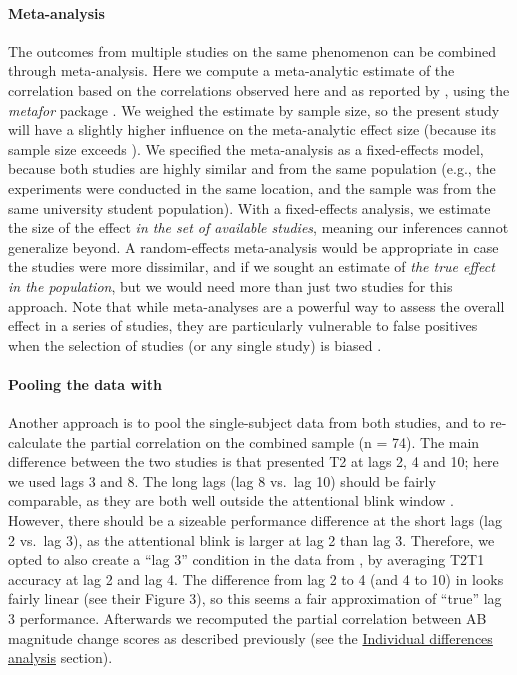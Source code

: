 \documentclass[11pt,]{memoir}
\let\oldparagraph\paragraph
\renewcommand{\paragraph}[1]{\oldparagraph{#1}\mbox{}}
\begin{document}
\hypertarget{meta}{%
\paragraph{Meta-analysis}\label{meta}}

The outcomes from multiple studies on the same phenomenon can be combined through meta-analysis. Here we compute a meta-analytic estimate of the correlation based on the correlations observed here and as reported by \textcite{London2015}, using the \emph{metafor} package \autocite[Version 2.0-0;][]{R-metafor}. We weighed the estimate by sample size, so the present study will have a slightly higher influence on the meta-analytic effect size (because its sample size exceeds \textcite{London2015}). We specified the meta-analysis as a fixed-effects model, because both studies are highly similar and from the same population (e.g., the experiments were conducted in the same location, and the sample was from the same university student population). With a fixed-effects analysis, we estimate the size of the effect \emph{in the set of available studies}, meaning our inferences cannot generalize beyond. A random-effects meta-analysis would be appropriate in case the studies were more dissimilar, and if we sought an estimate of \emph{the true effect in the population}, but we would need more than just two studies for this approach. Note that while meta-analyses are a powerful way to assess the overall effect in a series of studies, they are particularly vulnerable to false positives when the selection of studies (or any single study) is biased \autocite{Ueno2016}.

\hypertarget{pool}{%
\paragraph{\texorpdfstring{Pooling the data with \textcite{London2015}}{Pooling the data with @London2015}}\label{pool}}

Another approach is to pool the single-subject data from both studies, and to re-calculate the partial correlation on the combined sample (n = 74). The main difference between the two studies is that \textcite{London2015} presented T2 at lags 2, 4 and 10; here we used lags 3 and 8. The long lags (lag 8 vs.~lag 10) should be fairly comparable, as they are both well outside the attentional blink window \autocite[\textgreater{} 500 ms following T1;][]{MacLean2012}. However, there should be a sizeable performance difference at the short lags (lag 2 vs.~lag 3), as the attentional blink is larger at lag 2 than lag 3. Therefore, we opted to also create a ``lag 3'' condition in the data from \textcite{London2015}, by averaging T2\textbar{}T1 accuracy at lag 2 and lag 4. The difference from lag 2 to 4 (and 4 to 10) in \textcite{London2015} looks fairly linear (see their Figure 3), so this seems a fair approximation of ``true'' lag 3 performance. Afterwards we recomputed the partial correlation between AB magnitude change scores as described previously (see the \protect\hyperlink{AB_tDCS-ind-diffs}{Individual differences analysis} section).
\end{document}
